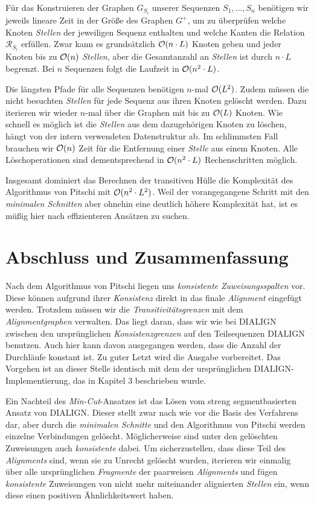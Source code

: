 Für das Konstruieren der Graphen $G_{S_i}$ unserer Sequenzen $S_1, \dots, S_n$ benötigen wir jeweils lineare Zeit in der Größe des Graphen $G^{+}$, um zu überprüfen welche Knoten \emph{Stellen} der jeweiligen Sequenz enthalten und welche Kanten die Relation $\mathcal{R}_{S_i}$ erfüllen. Zwar kann es grundsätzlich $\mathcal{O}(n\cdot L)$ Knoten geben und jeder Knoten bis zu $\mathcal{O}(n)$ \emph{Stellen}, aber die Gesamtanzahl an \emph{Stellen} ist durch $n\cdot L$ begrenzt. Bei $n$ Sequenzen folgt die Laufzeit in $\mathcal{O}(n^2\cdot L)$.

Die längsten Pfade für alle Sequenzen benötigen $n$-mal $\mathcal{O}(L^2)$. Zudem müssen die nicht besuchten \emph{Stellen} für jede Sequenz aus ihren Knoten gelöscht werden. Dazu iterieren wir wieder $n$-mal über die Graphen mit bis zu $\mathcal{O}(L)$ Knoten. Wie schnell es möglich ist die \emph{Stellen} aus dem dazugehörigen Knoten zu löschen, hängt von der intern verwendeten Datenstruktur ab. Im schlimmsten Fall brauchen wir $\mathcal{O}(n)$ Zeit für die Entfernung einer \emph{Stelle} aus einem Knoten. Alle Löschoperationen sind dementsprechend in $\mathcal{O}(n^2\cdot L)$ Rechenschritten möglich.

Insgesamt dominiert das Berechnen der transitiven Hülle die Komplexität des Algorithmus von Pitschi mit $\mathcal{O}(n^2\cdot L^2)$. Weil der vorangegangene Schritt mit den \emph{minimalen Schnitten} aber ohnehin eine deutlich höhere Komplexität hat, ist es müßig hier nach effizienteren Ansätzen zu suchen. 

\section{Abschluss und Zusammenfassung}

Nach dem Algorithmus von Pitschi liegen uns \emph{konsistente Zuweisungsspalten} vor. Diese können aufgrund ihrer \emph{Konsistenz} direkt in das finale \emph{Alignment} eingefügt werden. Trotzdem müssen wir die \emph{Transitivitätsgrenzen} mit dem \emph{Alignmentgraphen} verwalten. Das liegt daran, dass wir wie bei DIALIGN zwischen den ursprünglichen \emph{Konsistenzgrenzen} auf den Teilsequenzen DIALIGN benutzen. Auch hier kann davon ausgegangen werden, dass die Anzahl der Durchläufe konstant ist. Zu guter Letzt wird die Ausgabe vorbereitet. Das Vorgehen ist an dieser Stelle identisch mit dem der ursprünglichen DIALIGN-Implementierung, das in Kapitel 3 beschrieben wurde.

Ein Nachteil des \emph{Min-Cut}-Ansatzes ist das Lösen vom streng segmentbasierten Ansatz von DIALIGN. Dieser stellt zwar nach wie vor die Basis des Verfahrens dar, aber durch die \emph{minimalen Schnitte} und den Algorithmus von Pitschi werden einzelne Verbindungen gelöscht. Möglicherweise sind unter den gelöschten Zuweisungen auch \emph{konsistente} dabei. Um sicherzustellen, dass diese Teil des \emph{Alignments} sind, wenn sie zu Unrecht gelöscht wurden, iterieren wir einmalig über alle ursprünglichen \emph{Fragmente} der paarweisen \emph{Alignments} und fügen \emph{konsistente} Zuweisungen von nicht mehr miteinander alignierten \emph{Stellen} ein, wenn diese einen positiven Ähnlichkeitswert haben. 

